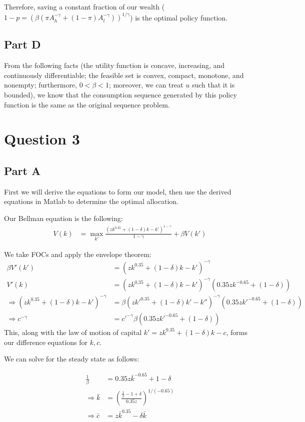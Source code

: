 \documentclass[11pt]{article} %
\begin{document}
Therefore, saving a constant fraction of our wealth ($1-p =   (\beta (\pi A_h^{-\gamma} + (1-\pi) A_l^{-\gamma}))^{1/\gamma}$) is the optimal policy function.

\subsection{Part D}
From the following facts (the utility function is concave, increasing, and continuously differentiable; the feasible set is convex, compact, monotone, and nonempty; furthermore, $0<\beta<1$; moreover, we can treat $u$ such that it is bounded), we know that the consumption sequence generated by this policy function is the same as the original sequence problem.

\section{Question 3}
\subsection{Part A}
First we will derive the equations to form our model, then use the derived equations in Matlab to determine the optimal allocation.

Our Bellman equation is the following:
\begin{align*}
V(k) &= \max_{k'} \frac{(zk^{0.35} + (1-\delta)k - k')^{1-\gamma}}{1-\gamma} +\beta V(k')
\end{align*}

We take FOCs and apply the envelope theorem:
\begin{align*}
\beta V'(k') &=(zk^{0.35} + (1-\delta)k - k')^{-\gamma} \\
V'(k) &= (zk^{0.35} + (1-\delta)k - k')^{-\gamma}(0.35zk^{-0.65} +(1-\delta)) \\
\Rightarrow (zk^{0.35} + (1-\delta)k - k')^{-\gamma} &= \beta (zk'^{0.35} + (1-\delta)k' - k'')^{-\gamma}(0.35zk'^{-0.65} +(1-\delta))\\
\Rightarrow c^{-\gamma} &= c'^{-\gamma} \beta(0.35zk'^{-0.65}+(1-\delta))
\end{align*}
This, along with the law of motion of capital $k' = zk^{0.35} +(1-\delta)k - c$, forms our difference equations for $k,c$.

We can solve for the steady state as follows:

\begin{align*}
\frac{1}{\beta} &= 0.35z\bar{k}^{-0.65} +1 - \delta\\
\Rightarrow \bar{k} &= \left(\frac{\frac{1}{\beta}-1+\delta}{0.35z}\right)^{1/(-0.65)}\\
\Rightarrow \bar{c} &= z\bar{k}^{0.35} - \delta \bar{k}
\end{align*}
\end{document}
